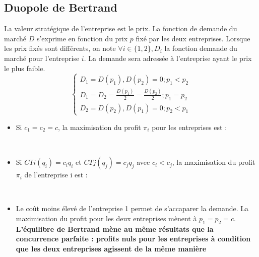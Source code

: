 \subsection{Duopole de Bertrand}
La valeur stratégique de l'entreprise est le prix. La fonction de demande du marché $D$ s'exprime en fonction du prix $p$ fixé par les deux entreprises.
Lorsque les prix fixés sont différents, on note $\forall i \in \{1,2\}, D_{i}$ la fonction demande du marché pour l'entreprise $i$. La demande sera adressée à l'entreprise ayant le prix le plus faible.
\[
\left \{
\begin{array}{c}
    D_{1} = D(p_{1}), D(p_{2}) = 0 ;p_{1} < p_{2}\\
    D_{1} = D_{2} = \frac{D(p_{1})}{2} =  \frac{D(p_{2})}{2} ;p_{1} = p_{2}\\
    D_{2} = D(p_{2}), D(p_{1}) = 0 ;p_{2} < p_{1}
\end{array}
\right.
\]
\begin{itemize}
    \item Si $c_{1} = c_{2} = c$, la maximisation du profit $\pi_{i}$ pour les entreprises est : \newline
    \textcolor{White}{.}
    \begin{center}
        \Large{}
    \end{center}
    \textcolor{White}{.}
    \item Si $CT{i}(q_{i}) = c_{i}q_{i}$ et $CT{j}(q_{j}) = c_{j}q_{j}$ avec $c_{i} < c_{j}$, la maximisation du profit $\pi_{i}$ de l'entreprise i est : \newline
    \textcolor{White}{.}
    \begin{center}
        \Large{}
    \end{center}
    \textcolor{White}{.}
    \item Le coût moins élevé de l'entreprise 1 permet de s'accaparer la demande. La maximisation du profit pour les deux entreprises mènent à $p_{1} = p_{2} = c$. \textbf{L'équilibre de Bertrand mène au même résultats que la concurrence parfaite : profits nuls pour les entreprises à condition que les deux entreprises agissent de la même manière}
\end{itemize}
\newpage
